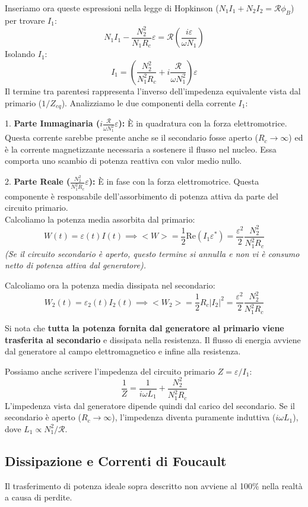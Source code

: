 \documentclass{book}
\begin{document}
Inseriamo ora queste espressioni nella legge di Hopkinson ($N_1 I_1 + N_2 I_2 = \mathcal{R} \phi_B$) per trovare $I_1$:
$$
N_1 I_1 - \frac{ N_2^2}{N_1 R_c}\varepsilon= \mathcal{R} \left( \frac{i \varepsilon}{\omega N_1} \right)
$$
Isolando $I_1$:
$$
I_1 = \left( \frac{N_2^2}{N_1^2 R_c} + i\frac{ \mathcal{R}}{\omega N_1^2} \right) \varepsilon
$$
Il termine tra parentesi rappresenta l'inverso dell'impedenza equivalente vista dal primario ($1/Z_{eq}$). Analizziamo le due componenti della corrente $I_1$:

1.  \textbf{Parte Immaginaria ($i\frac{ \mathcal{R}}{\omega N_1^2} \varepsilon$):} È in quadratura con la forza elettromotrice. Questa corrente sarebbe presente anche se il secondario fosse aperto ($R_c \to \infty$) ed è la corrente magnetizzante necessaria a sostenere il flusso nel nucleo. Essa comporta uno scambio di potenza reattiva con valor medio nullo.

2.  \textbf{Parte Reale ($\frac{N_2^2}{N_1^2 R_c} \varepsilon$):} È in fase con la forza elettromotrice. Questa componente è responsabile dell'assorbimento di potenza attiva da parte del circuito primario.
\\
Calcoliamo la potenza media assorbita dal primario:
$$
W(t) = \varepsilon(t) I(t) \implies <W> = \frac{1}{2} \text{Re}(I_1 \varepsilon^*) = \frac{\varepsilon^2}{2} \frac{N_2^2}{N_1^2 R_c}
$$
\emph{(Se il circuito secondario è aperto, questo termine si annulla e non vi è consumo netto di potenza attiva dal generatore).}

Calcoliamo ora la potenza media dissipata nel secondario:
$$
W_2(t) = \varepsilon_2(t) I_2(t) \implies <W_2> = \frac{1}{2} R_c |I_2|^2 = \frac{\varepsilon^2}{2} \frac{N_2^2}{N_1^2 R_c}
$$

Si nota che \textbf{tutta la potenza fornita dal generatore al primario viene trasferita al secondario} e dissipata nella resistenza. Il flusso di energia avviene dal generatore al campo elettromagnetico e infine alla resistenza.

Possiamo anche scrivere l'impedenza del circuito primario $Z = \varepsilon / I_1$:
$$
 \frac{1}{Z} = \frac{1}{i \omega L_1} + \frac{N_2^2 }{N_1^2 R_c}
$$
L'impedenza vista dal generatore dipende quindi dal carico del secondario. Se il secondario è aperto ($R_c \to \infty$), l'impedenza diventa puramente induttiva ($i\omega L_1$), dove $L_1 \propto N_1^2/\mathcal{R}$.

\subsection{Dissipazione e Correnti di Foucault}
Il trasferimento di potenza ideale sopra descritto non avviene al 100\% nella realtà a causa di perdite.
\end{document}
